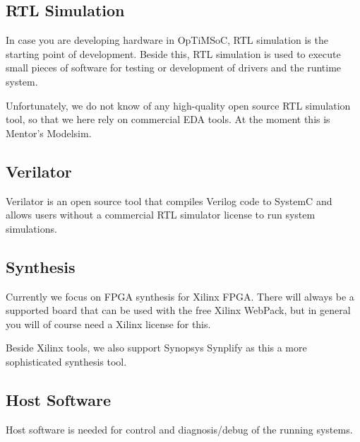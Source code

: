\subsection*{RTL Simulation}

In case you are developing hardware in OpTiMSoC, RTL simulation is the
starting point of development. Beside this, RTL simulation is used to
execute small pieces of software for testing or development of drivers
and the runtime system.

Unfortunately, we do not know of any high-quality open source RTL
simulation tool, so that we here rely on commercial EDA tools. At the
moment this is Mentor's Modelsim.

\subsection*{Verilator}

Verilator is an open source tool that compiles Verilog code to SystemC
and allows users without a commercial RTL simulator license to run
system simulations.

\subsection*{Synthesis}

Currently we focus on FPGA synthesis for Xilinx FPGA. There will
always be a supported board that can be used with the free Xilinx
WebPack, but in general you will of course need a Xilinx license for
this.

Beside Xilinx tools, we also support Synopsys Synplify as this a more
sophisticated synthesis tool.

\subsection*{Host Software}

Host software is needed for control and diagnosis/debug of the running
systems.

